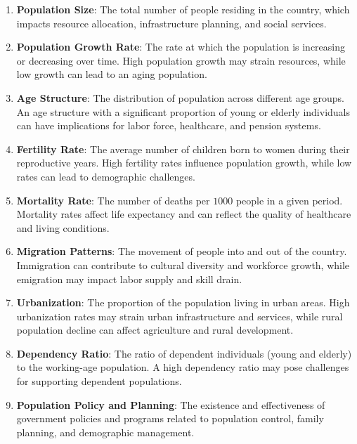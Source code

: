 \begin{enumerate}
  \item \textbf{Population Size}: The total number of
  people residing in the country, which impacts resource
  allocation, infrastructure planning, and social services.
  
  \item \textbf{Population Growth Rate}: The rate at which
  the population is increasing or decreasing over time. High
  population growth may strain resources, while low growth
  can lead to an aging population.
  
  \item \textbf{Age Structure}: The distribution of population
  across different age groups. An age structure with a significant
  proportion of young or elderly individuals can have implications
  for labor force, healthcare, and pension systems.
  
  \item \textbf{Fertility Rate}: The average number of children
  born to women during their reproductive years. High fertility
  rates influence population growth, while low rates can lead
  to demographic challenges.
  
  \item \textbf{Mortality Rate}: The number of deaths per \(1000\)
  people in a given period. Mortality rates affect life expectancy 
  and can reflect the quality of healthcare and living conditions.
  
  \item \textbf{Migration Patterns}: The movement of people into
  and out of the country. Immigration can contribute to cultural
  diversity and workforce growth, while emigration may impact
  labor supply and skill drain.
  
  \item \textbf{Urbanization}: The proportion of the population
  living in urban areas. High urbanization rates may strain urban
  infrastructure and services, while rural population decline can
  affect agriculture and rural development.
  
  \item \textbf{Dependency Ratio}: The ratio of dependent individuals
  (young and elderly) to the working-age population. A high dependency
  ratio may pose challenges for supporting dependent populations.
  
  \item \textbf{Population Policy and Planning}: The existence and
  effectiveness of government policies and programs related to
  population control, family planning, and demographic management.
  

\end{enumerate}
